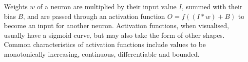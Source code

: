 \documentclass[12pt,a4paper]{article}
\begin{document}

        
        Weights $w$ of a neuron are multiplied by their input value $I$, summed with their bias $B$, and are passed through an activation function $O = f((I* w) + B)$ to become an input for another neuron. Activation functions, when visualised, usually have a sigmoid curve, but may also take the form of other shapes. Common characteristics of activation functions include values to be monotonically increasing, continuous, differentiable and bounded.
\end{document}

